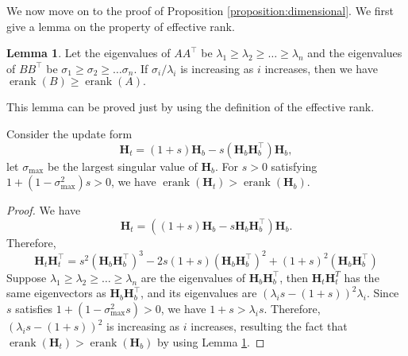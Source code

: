 \documentclass{article}
\def\mH{{\bm{H}}}
\theoremstyle{definition}
\newenvironment{manualproposition}[1]{\renewcommand\themanualtheoreminner{#1}\manualtheoreminner
}{\endmanualtheoreminner}
\newtheorem{lemma}{Lemma}[section]
\theoremstyle{remark}
\theoremstyle{theorem}
\begin{document}
We now move on to the proof of Proposition \ref{proposition:dimensional}. We first give a lemma on the property of effective rank.
\begin{lemma}
    Let the eigenvalues of $AA^{\top}$ be $\lambda_1\geq\lambda_2\geq\dots\geq\lambda_n$ and the eigenvalues of $BB^{\top}$ be $\sigma_1\geq\sigma_2\geq\dots\sigma_n$. If $\sigma_i/\lambda_i$ is increasing as $i$ increases, then we have $\operatorname{erank}(B)\geq \operatorname{erank}(A).$ \label{lemma3}
\end{lemma}
This lemma can be proved just by using the definition of the effective rank.
\begin{manualproposition}{2}
Consider the update form
    \begin{equation}
    \mH_t=(1+s)\mH_b-s(\mH_b\mH_b^{\top})\mH_b,
    \end{equation}
    let $\sigma_{\max}$ be the largest singular value of $\mH_b$. For $s>0$ satisfying $1+(1-\sigma^2_{\max})s>0$, we have $\operatorname{erank}(\mH_t)>\operatorname{erank}(\mH_b)$.
\end{manualproposition}
\begin{proof}
    We have
    \begin{equation}
        \mH_t=((1+s)\mH_b-s\mH_b\mH_b^{\top})\mH_b.
    \end{equation}
    Therefore,
    \begin{equation}
        \mH_t\mH_t^{\top}=s^2(\mH_b\mH_b^{\top})^3-2s(1+s)(\mH_b\mH_b^{\top})^2+(1+s)^2(\mH_b\mH_b^{\top})
    \end{equation}
    Suppose $\lambda_1\geq\lambda_2\geq\dots\geq\lambda_n$ are the eigenvalues of $\mH_b\mH_b^{\top}$, then $\mH_t\mH_t^{T}$ has the same eigenvectors as $\mH_b\mH_b^{\top}$, and its eigenvalues are $(\lambda_is-(1+s))^2\lambda_i$. Since $s$ satisfies $1+(1-\sigma^2_{\max}s)>0$, we have $1+s>\lambda_i s$. Therefore, $(\lambda_is-(1+s))^2$ is increasing as $i$ increases, resulting the fact that $\operatorname{erank}(\mH_t)>\operatorname{erank}(\mH_b)$ by using Lemma \ref{lemma3}. 
\end{proof}
\end{document}

